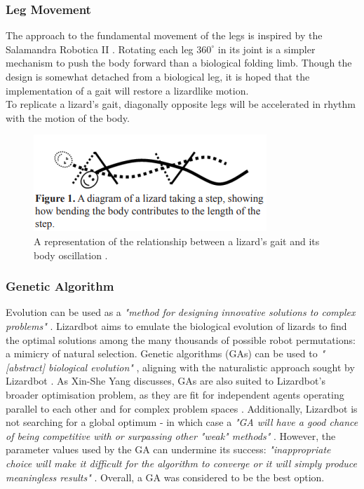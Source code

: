 \documentclass{article}
\begin{document}
\subsubsection{Leg Movement}
\label{sec:Leg Movement}
The approach to the fundamental movement of the legs is inspired by the Salamandra Robotica II . Rotating each leg $360^\circ$ in its joint is a simpler mechanism to push the body forward than a biological folding limb. Though the design is somewhat detached from a biological leg, it is hoped that the implementation of a gait will restore a lizardlike motion.\\
To replicate a lizard's gait, diagonally opposite legs will be accelerated in rhythm with the motion of the body. 
\begin{figure}[H]
\centering
\includegraphics[scale=1]{lizardGait}
\caption{A representation of the relationship between a lizard's gait and its body oscillation \citep{reptileLocomotion}.}
\end{figure}

\newpage
\subsubsection{Genetic Algorithm}
\label{sec:Genetic Algorithm Aims}
Evolution can be used as a \textit{"method for designing innovative solutions to complex problems"} . Lizardbot aims to emulate the biological evolution of lizards to find the optimal solutions among the many thousands of possible robot permutations: a mimicry of natural selection. Genetic algorithms (GAs) can be used to \textit{"[abstract] biological evolution"} , aligning with the naturalistic approach sought by Lizardbot . As Xin-She Yang discusses, GAs are also suited to Lizardbot's broader optimisation problem, as they are fit for independent agents operating parallel to each other and for complex problem spaces . Additionally, Lizardbot is not searching for a global optimum - in which case a \textit{"GA will have a good chance of being competitive with or surpassing other "weak" methods"} . However, the parameter values used by the GA can undermine its success: \textit{"inappropriate choice will make it difficult for the algorithm to converge or it will simply produce meaningless results"} . Overall, a GA was considered to be the best option.\\
\end{document}
